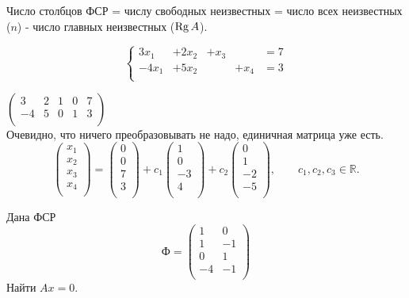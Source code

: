 Число столбцов ФСР = числу свободных неизвестных = число всех неизвестных ($n$) - число главных неизвестных ($\operatorname{\mathop{Rg}} A$). 
\begin{prim}
	$$
	\left\{
	\begin{array}{rrrrrl}
		3x_1&+2x_2&+x_3&&=7\\
		-4x_1&+5x_2&&+x_4&=3\\
	\end{array} \right.
	$$
\end{prim}
$
\left( \begin{array}{cccc|c}
3 & 2& 1 & 0& 7\\
-4 & 5& 0 & 1& 3\\
\end{array}\right)
$\\
Очевидно, что ничего преобразовывать не надо, единичная матрица уже есть.\\
$$
\begin{pmatrix}
x_1\\
x_2\\
x_3\\
x_4\\
\end{pmatrix}
=
\begin{pmatrix}
0\\
0\\
7\\
3\\
\end{pmatrix}
+c_1
\begin{pmatrix}
1\\
0\\
-3\\
4\\
\end{pmatrix}
+c_2
\begin{pmatrix}
0\\
1\\
-2\\
-5\\
\end{pmatrix}
, \qquad c_1, c_2, c_3 \in \mathbb{R}.
$$
\vspace{3cm}
\begin{prim}
	Дана ФСР
	$$
	\text{Ф}=
	\begin{pmatrix}
	1&0\\
	1&-1\\
	0&1\\
	-4&-1\\
	\end{pmatrix}
	$$
	Найти $Ax=0$.
\end{prim}

